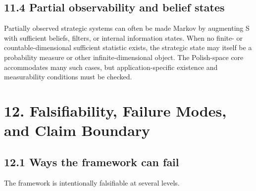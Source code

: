 \documentclass[10pt]{article}
\begin{document}
\subsection{11.4 Partial observability and belief
states}\label{partial-observability-and-belief-states}

Partially observed strategic systems can often be made Markov by
augmenting S with sufficient beliefs, filters, or internal information
states. When no finite- or countable-dimensional sufficient statistic
exists, the strategic state may itself be a probability measure or other
infinite-dimensional object. The Polish-space core accommodates many
such cases, but application-specific existence and measurability
conditions must be checked.



\section{12. Falsifiability, Failure Modes, and Claim
Boundary}\label{falsifiability-failure-modes-and-claim-boundary}

\subsection{12.1 Ways the framework can
fail}\label{ways-the-framework-can-fail}

The framework is intentionally falsifiable at several levels.
\end{document}
